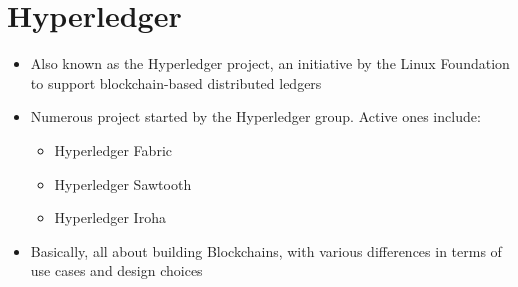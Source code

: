 \section{Hyperledger}
\begin{itemize}
	\item Also known as the Hyperledger project, an initiative by the Linux Foundation to support blockchain-based distributed ledgers
	\item Numerous project started by the Hyperledger group. Active ones include:
	\begin{itemize}
		\item Hyperledger Fabric
		\item Hyperledger Sawtooth
		\item Hyperledger Iroha
	\end{itemize}
	\item Basically, all about building Blockchains, with various differences in terms of use cases and design choices
\end{itemize}
